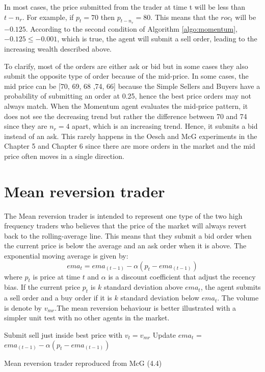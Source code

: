 In most cases, the price submitted from the trader at time t will be less than $t-n_r$. For example, if $p_t = 70$ then $p_{t - n_r} = 80$. This means that the $roc_t$ will be $-0.125$. According to the second condition of Algorithm \ref{algo:momentum}, $-0.125 \leq -0.001$, which is true, the agent will submit a sell order, leading to the increasing wealth described above.

To clarify, most of the orders are either ask or bid but in some cases they also submit the opposite type of order because of the mid-price. In some cases, the mid price can be [70, 69, 68 ,74, 66] because the Simple Sellers and Buyers have a probability of submitting an order at 0.25, hence the best price orders may not always match. When the Momentum agent evaluates the mid-price pattern, it does not see the decreasing trend but rather the difference between 70 and 74 since they are $n_r = 4$ apart, which is an increasing trend. Hence, it submits a bid instead of an ask. This rarely happens in the Oesch and McG experiments in the Chapter 5 and Chapter 6 since there are more orders in the market and the mid price often moves in a single direction. 

\section{Mean reversion trader}
The Mean reversion trader is intended to represent one type of the two high frequency traders who believes that the price of the market will always revert back to the rolling-average line.  This means that they submit a bid order when the current price is below the average and an ask order when it is above. The exponential moving average is given by: 
\begin{equation}
    ema_t = ema_{(t-1)} - \alpha(p_t - ema_{(t-1)})
\end{equation}
where $p_t$ is price at time $t$ and $\alpha$ is a discount coefficient that adjust the recency bias. If the current price $p_t$ is $k$ standard deviation above $ema_t$, the agent submits a sell order and a buy order if it is $k$ standard deviation below $ema_t$. The volume is denote by $v_{mr}$.The mean reversion behaviour is better illustrated with a simpler unit test with no other agents in the market.

\begin{algorithm}[H]
\DontPrintSemicolon 
{} {
     {
    Submit sell just inside best price with $v_t = v_{mr}$\;
    }
    \EndIf
  }
\EndIf
Update $ema_t$ = $ema_{(t-1)} - \alpha(p_t - ema_{(t-1)})$
\caption{{\sc Mean reversion trader reproduced from McG (4.4) \cite{McGroarty}} }
\label{algo:max}
\end{algorithm}

